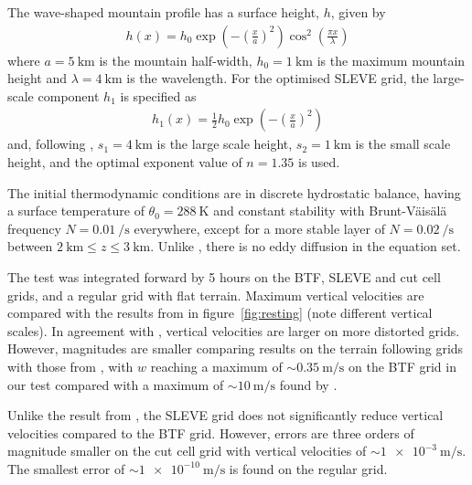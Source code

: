 \documentclass[twocol]{ametsoc}
\begin{document}
The wave-shaped mountain profile has a surface height, $h$, given by
\begin{align}
	h(x) = h_0 \exp \left( - \left( \frac{x}{a} \right)^2 \right) \cos^2 \left( \frac{\pi x}{\lambda} \right) \label{eqn:resting:mountain}
\end{align}
where $a = \SI{5}{\kilo\meter}$ is the mountain half-width, $h_0 = \SI{1}{\kilo\meter}$ is the maximum mountain height and $\lambda = \SI{4}{\kilo\meter}$ is the wavelength.  For the optimised SLEVE grid, the large-scale component $h_1$ is specified as
\begin{align}
h_1(x) = \frac{1}{2} h_0 \exp \left( - \left( \frac{x}{a} \right)^2 \right)
\end{align}
and, following \cite{leuenberger2010}, $s_1 = \SI{4}{\kilo\meter}$ is the large scale height, $s_2 = \SI{1}{\kilo\meter}$ is the small scale height, and the optimal exponent value of $n = 1.35$ is used.

The initial thermodynamic conditions are in discrete hydrostatic balance, having a surface temperature of $\theta_0 = \SI{288}{\kelvin}$ and constant stability with Brunt-V\"ais\"al\"a frequency $N = \SI{0.01}{\per\second}$ everywhere, except for a more stable layer of $N = \SI{0.02}{\per\second}$ between $\SI{2}{\kilo\meter} \leq z \leq \SI{3}{\kilo\meter}$.  Unlike \citet{klemp2011}, there is no eddy diffusion in the equation set.

The test was integrated forward by 5 hours on the BTF, SLEVE and cut cell grids, and a regular grid with flat terrain.  Maximum vertical velocities are compared with the results from \citet{klemp2011} in figure~\ref{fig:resting} (note different vertical scales).  In agreement with \citet{klemp2011}, vertical velocities are larger on more distorted grids.  However, magnitudes are smaller comparing results on the terrain following grids with those from \citet{klemp2011}, with $w$ reaching a maximum of \(\sim \SI{0.35}{\meter\per\second}\) on the BTF grid in our test compared with a maximum of \(\sim \SI{10}{\meter\per\second}\) found by \citet{klemp2011}.

Unlike the result from \citet{klemp2011}, the SLEVE grid does not significantly reduce vertical velocities compared to the BTF grid.  However, errors are three orders of magnitude smaller on the cut cell grid with vertical velocities of \(\sim \SI{1e-3}{\meter\per\second}\).  The smallest error of \(\sim \SI{1e-10}{\meter\per\second}\) is found on the regular grid.
\end{document}

